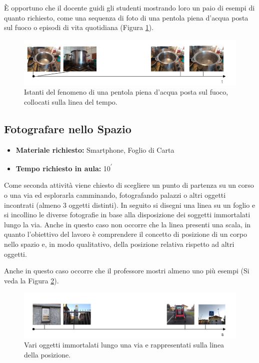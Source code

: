 \documentclass{report} \usepackage[T1]{fontenc} \usepackage[italian]{babel}
\begin{document}
\`E opportuno che il docente guidi gli studenti mostrando loro un paio di esempi
di quanto richiesto, come una sequenza di foto di una pentola piena d’acqua
posta sul fuoco o episodi di vita quotidiana (Figura \ref{fig:asse_t_pentola}).
\begin{figure}[H]
\centering
  \includegraphics[width=\textwidth]{asse_t_pentola}
  \caption{Istanti del fenomeno di una pentola piena d'acqua posta sul fuoco,
           collocati sulla linea del tempo.}
  \label{fig:asse_t_pentola}
\end{figure}

\subsection{Fotografare nello Spazio}

\begin{itemize}
\item \textbf{Materiale richiesto:} Smartphone, Foglio di Carta
\item \textbf{Tempo richiesto in aula:} 10\textsuperscript{$\prime$}
\end{itemize}

Come seconda attività viene chiesto di scegliere un punto di partenza su un
corso o una via ed esplorarla camminando, fotografando palazzi o altri oggetti
incontrati (almeno 3 oggetti distinti). In seguito si disegni una linea su un
foglio e si incollino le diverse fotografie in base alla disposizione dei
soggetti immortalati lungo la via. Anche in questo caso non occorre che la
linea presenti una scala, in quanto l’obiettivo del lavoro è comprendere il
concetto di posizione di un corpo nello spazio e, in modo qualitativo, della
posizione relativa rispetto ad altri oggetti.

Anche in questo caso occorre che il professore mostri almeno uno più esempi
(Si veda la Figura \ref{fig:asse_s}).
\begin{figure}[H]
\centering
  \includegraphics[width=\textwidth]{asse_s}
  \caption{Vari oggetti immortalati lungo una via e rappresentati
           sulla linea della posizione.}
  \label{fig:asse_s}
\end{figure}
\end{document}
